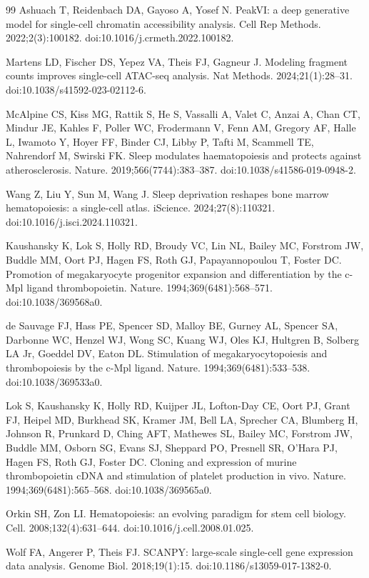 \documentclass[referee, pdflatex, sn-vancouver-num]{sn-jnl}
\begin{document}
\begin{thebibliography}{99}
Ashuach T, Reidenbach DA, Gayoso A, Yosef N. PeakVI: a deep generative model for single-cell chromatin accessibility analysis. Cell Rep Methods. 2022;2(3):100182. doi:10.1016/j.crmeth.2022.100182.

Martens LD, Fischer DS, Yepez VA, Theis FJ, Gagneur J. Modeling fragment counts improves single-cell ATAC-seq analysis. Nat Methods. 2024;21(1):28--31. doi:10.1038/s41592-023-02112-6.

McAlpine CS, Kiss MG, Rattik S, He S, Vassalli A, Valet C, Anzai A, Chan CT, Mindur JE, Kahles F, Poller WC, Frodermann V, Fenn AM, Gregory AF, Halle L, Iwamoto Y, Hoyer FF, Binder CJ, Libby P, Tafti M, Scammell TE, Nahrendorf M, Swirski FK. Sleep modulates haematopoiesis and protects against atherosclerosis. Nature. 2019;566(7744):383--387. doi:10.1038/s41586-019-0948-2.

Wang Z, Liu Y, Sun M, Wang J. Sleep deprivation reshapes bone marrow hematopoiesis: a single-cell atlas. iScience. 2024;27(8):110321. doi:10.1016/j.isci.2024.110321.

Kaushansky K, Lok S, Holly RD, Broudy VC, Lin NL, Bailey MC, Forstrom JW, Buddle MM, Oort PJ, Hagen FS, Roth GJ, Papayannopoulou T, Foster DC. Promotion of megakaryocyte progenitor expansion and differentiation by the c-Mpl ligand thrombopoietin. Nature. 1994;369(6481):568--571. doi:10.1038/369568a0.

de Sauvage FJ, Hass PE, Spencer SD, Malloy BE, Gurney AL, Spencer SA, Darbonne WC, Henzel WJ, Wong SC, Kuang WJ, Oles KJ, Hultgren B, Solberg LA Jr, Goeddel DV, Eaton DL. Stimulation of megakaryocytopoiesis and thrombopoiesis by the c-Mpl ligand. Nature. 1994;369(6481):533--538. doi:10.1038/369533a0.

Lok S, Kaushansky K, Holly RD, Kuijper JL, Lofton-Day CE, Oort PJ, Grant FJ, Heipel MD, Burkhead SK, Kramer JM, Bell LA, Sprecher CA, Blumberg H, Johnson R, Prunkard D, Ching AFT, Mathewes SL, Bailey MC, Forstrom JW, Buddle MM, Osborn SG, Evans SJ, Sheppard PO, Presnell SR, O'Hara PJ, Hagen FS, Roth GJ, Foster DC. Cloning and expression of murine thrombopoietin cDNA and stimulation of platelet production in vivo. Nature. 1994;369(6481):565--568. doi:10.1038/369565a0.

Orkin SH, Zon LI. Hematopoiesis: an evolving paradigm for stem cell biology. Cell. 2008;132(4):631--644. doi:10.1016/j.cell.2008.01.025.

Wolf FA, Angerer P, Theis FJ. SCANPY: large-scale single-cell gene expression data analysis. Genome Biol. 2018;19(1):15. doi:10.1186/s13059-017-1382-0.

\end{thebibliography}
\end{document}
